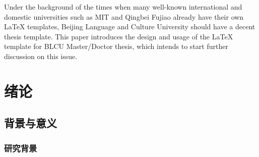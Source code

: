 \documentclass[doctor,final,oneside,continuousNum]{blcuthesis}
\begin{document}
	
	\pagestyle{plain}
	
	\makecover
	\makeIntegrityStatement
	
	\begin{abstract}
		在麻省理工、清北复交等众多国际国内知名大学早已拥有属于自己的 \LaTeX{} 模板的时代背景之下，北京语言大学理应拥有一份像样的论文模板。本文介绍北京语言大学硕士、博士研究生学位论文 \LaTeX{} 模板的设计与使用说明，权当抛砖引玉。
		
	\end{abstract}
	
	\begin{abstract*}
		Under the background of the times when many well-known international and domestic universities such as MIT and Qingbei Fujiao already have their own \LaTeX{} templates, Beijing Language and Culture University should have a decent thesis template. This paper introduces the design and usage of the \LaTeX{} template for BLCU Master/Doctor thesis, which intends to start further discussion on this issue.
		
	\end{abstract*}

	\makecontents
	\listoffiguresandtables
	
	\setcounter{page}{1}
	
	\chapter{绪论}
	\section{背景与意义}
	\subsection{研究背景}
\end{document}
